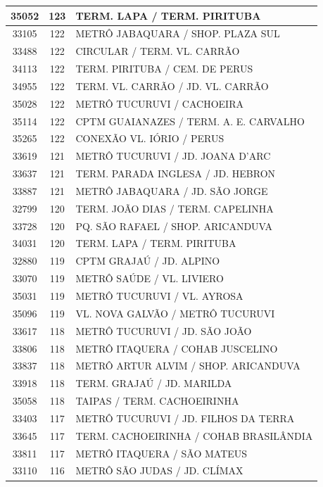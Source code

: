 \documentclass[
	12pt,				%
	oneside,			%
	a4paper,			%
	english,			%
	brazil				%
	]{abntex2ppgsi}
\begin{document}
{{{\begin{apendicesenv}
\begin{longtable}{c|c|p{7cm}}
 \hline 
35052 &	123 &	TERM. LAPA / TERM. PIRITUBA \\ 
 \hline 
33105 &	122 &	METRÔ JABAQUARA / SHOP. PLAZA SUL \\ 
 \hline 
33488 &	122 &	CIRCULAR / TERM. VL. CARRÃO \\ 
 \hline 
34113 &	122 &	TERM. PIRITUBA / CEM. DE PERUS \\ 
 \hline 
34955 &	122 &	TERM. VL. CARRÃO / JD. VL. CARRÃO \\ 
 \hline 
35028 &	122 &	METRÔ TUCURUVI / CACHOEIRA \\ 
 \hline 
35114 &	122 &	CPTM GUAIANAZES / TERM. A. E. CARVALHO \\ 
 \hline 
35265 &	122 &	CONEXÃO VL. IÓRIO / PERUS \\ 
 \hline 
33619 &	121 &	METRÔ TUCURUVI / JD. JOANA D'ARC \\ 
 \hline 
33637 &	121 &	TERM. PARADA INGLESA / JD. HEBRON \\ 
 \hline 
33887 &	121 &	METRÔ JABAQUARA / JD. SÃO JORGE \\ 
 \hline 
32799 &	120 &	TERM. JOÃO DIAS / TERM. CAPELINHA \\ 
 \hline 
33728 &	120 &	PQ. SÃO RAFAEL / SHOP. ARICANDUVA \\ 
 \hline 
34031 &	120 &	TERM. LAPA / TERM. PIRITUBA \\ 
 \hline 
32880 &	119 &	CPTM GRAJAÚ / JD. ALPINO \\ 
 \hline 
33070 &	119 &	METRÔ SAÚDE / VL. LIVIERO \\ 
 \hline 
35031 &	119 &	METRÔ TUCURUVI / VL. AYROSA \\ 
 \hline 
35096 &	119 &	VL. NOVA GALVÃO / METRÔ TUCURUVI \\ 
 \hline 
33617 &	118 &	METRÔ TUCURUVI / JD. SÃO JOÃO \\ 
 \hline 
33806 &	118 &	METRÔ ITAQUERA / COHAB JUSCELINO \\ 
 \hline 
33837 &	118 &	METRÔ ARTUR ALVIM / SHOP. ARICANDUVA \\ 
 \hline 
33918 &	118 &	TERM. GRAJAÚ / JD. MARILDA \\ 
 \hline 
35058 &	118 &	TAIPAS / TERM. CACHOEIRINHA \\ 
 \hline 
33403 &	117 &	METRÔ TUCURUVI / JD. FILHOS DA TERRA \\ 
 \hline 
33645 &	117 &	TERM. CACHOEIRINHA / COHAB BRASILÂNDIA \\ 
 \hline 
33811 &	117 &	METRÔ ITAQUERA / SÃO MATEUS \\ 
 \hline 
33110 &	116 &	METRÔ SÃO JUDAS / JD. CLÍMAX \\ 

\end{longtable}
\end{apendicesenv}}}}
\end{document}
